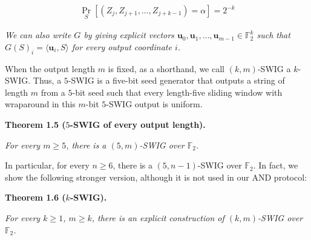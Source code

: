 \documentclass[10pt,a4paper]{article}
\begin{document}
\[\begin{gathered}
\Pr_{S}[(Z_{j},Z_{j+1},\ldots,Z_{j+k-1})=\alpha]=2^{-k}
\end{gathered}\]


\emph{We can also write $G$ by giving explicit vectors $\mathbf{u}_{0},\mathbf{u}_{1},\ldots,\mathbf{u}_{m-1}\in\mathbb{F}_{2}^{k}$ such that
$G(S)_{i}=\langle\mathbf{u}_{i},S\rangle$
for every output coordinate $i$.}\par






When the output length $m$ is fixed, as a shorthand, we call $(k,m)$-SWIG a
$k$-SWIG. Thus, a $5$-SWIG is a five-bit seed generator that outputs a string of length $m$ from a $5$-bit seed such that every length-five sliding window with wraparound in this $m$-bit $5$-SWIG output is uniform.\par





\par\medskip\noindent\textbf{
\textbf{Theorem 1.5}\textbf{ }($5$-SWIG of every output length)\textbf{.}
}\par



\emph{For every $m\geq 5$, there is a $(5,m)$-SWIG over $\mathbb{F}_{2}$.}\par






In particular, for every $n\geq 6$, there is a $(5,n-1)$-SWIG over $\mathbb{F}_{2}$. In fact,
we show the following stronger version, although it is not used in our AND protocol:\par






\par\medskip\noindent\textbf{
\textbf{Theorem 1.6}\textbf{ }($k$-SWIG)\textbf{.}
}\par



\emph{For every $k\geq 1$, $m\geq k$, there is an explicit construction of $(k,m)$-SWIG over $\mathbb{F}_{2}$.}\par
\end{document}
